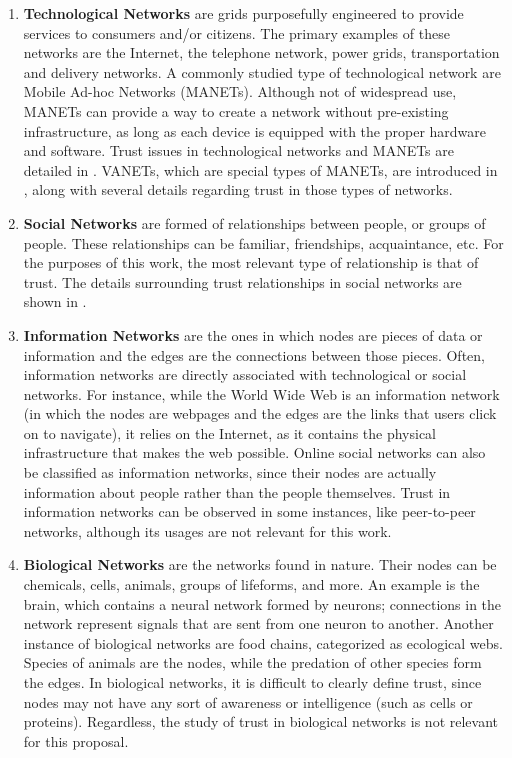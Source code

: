 \begin{enumerate}
	\item \textbf{Technological Networks} are grids purposefully engineered to provide services to consumers and/or citizens.
	 	The primary examples of these networks are the Internet, the telephone network, power grids, transportation and delivery networks.
	 	A commonly studied type of technological network are Mobile Ad-hoc Networks (MANETs).
		Although not of widespread use, MANETs can provide a way to create a network without pre-existing infrastructure, as long as each device is equipped with the proper hardware and software.
		Trust issues in technological networks and MANETs are detailed in .
		VANETs, which are special types of MANETs, are introduced in , along with several details regarding trust in those types of networks.
	\item \textbf{Social Networks} are formed of relationships between people, or groups of people.
		These relationships can be familiar, friendships, acquaintance, etc.
		For the purposes of this work, the most relevant type of relationship is that of trust.
		The details surrounding trust relationships in social networks are shown in .
	\item \textbf{Information Networks} are the ones in which nodes are pieces of data or information and the edges are the connections between those pieces.
		Often, information networks are directly associated with technological or social networks.
		For instance, while the World Wide Web is an information network (in which the nodes are webpages and the edges are the links that users click on to navigate), it relies on the Internet, as it contains the physical infrastructure that makes the web possible.
		Online social networks can also be classified as information networks, since their nodes are actually information about people rather than the people themselves.
		Trust in information networks can be observed in some instances, like peer-to-peer networks, although its usages are not relevant for this work.
	\item \textbf{Biological Networks} are the networks found in nature.
		Their nodes can be chemicals, cells, animals, groups of lifeforms, and more.
		An example is the brain, which contains a neural network formed by neurons; connections in the network represent signals that are sent from one neuron to another.
		Another instance of biological networks are food chains, categorized as ecological webs.
		Species of animals are the nodes, while the predation of other species form the edges.
		In biological networks, it is difficult to clearly define trust, since nodes may not have any sort of awareness or intelligence (such as cells or proteins).
		Regardless, the study of trust in biological networks is not relevant for this proposal.
		
\end{enumerate}

